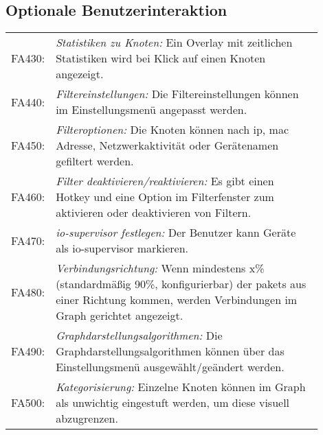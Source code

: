 \subsection{Optionale Benutzerinteraktion}

\begin{tabular}{lp{0.9\linewidth}}

FA430: & \textit{Statistiken zu Knoten: }Ein Overlay mit zeitlichen Statistiken wird bei Klick auf einen Knoten angezeigt. \\

FA440: & \textit{Filtereinstellungen: }Die Filtereinstellungen können im Einstellungsmenü angepasst werden. \\

FA450: & \textit{Filteroptionen: }Die Knoten können nach \gls{ip}, \gls{mac} Adresse, Netzwerkaktivität oder Gerätenamen gefiltert werden. \\

FA460: & \textit{Filter deaktivieren/reaktivieren: }Es gibt einen Hotkey und eine Option im Filterfenster zum aktivieren oder deaktivieren von Filtern. \\

FA470: & \textit{\gls{io-supervisor} festlegen: }Der Benutzer kann Geräte als \gls{io-supervisor} markieren. \\

FA480: & \textit{Verbindungsrichtung: }Wenn mindestens x\% (standardmäßig 90\%, konfigurierbar) der \glspl{paket} aus einer Richtung kommen, werden Verbindungen im Graph gerichtet angezeigt. \\

FA490: & \textit{Graphdarstellungsalgorithmen: }Die Graphdarstellungsalgorithmen können über das Einstellungsmenü ausgewählt/geändert werden. \\

FA500: & \textit{Kategorisierung: }Einzelne Knoten können im Graph als unwichtig eingestuft werden, um diese visuell abzugrenzen. \\
\end{tabular}
